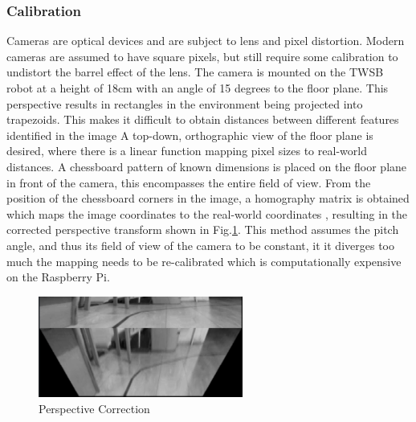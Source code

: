         \subsubsection{Calibration}
        Cameras are optical devices and are subject to lens and pixel distortion. Modern cameras are assumed to have square pixels, 
        but still require some calibration to undistort the barrel effect of the lens. 
        The camera is mounted on the TWSB robot at a height of 18cm with an angle of 15 degrees to the floor plane.
        This perspective results in rectangles in the environment being projected into trapezoids.  This makes it difficult to 
        obtain distances between different features identified in the image \cite{tuohy2010distance}
        A top-down, orthographic view of the floor plane is desired, where there is a linear function mapping pixel sizes 
        to real-world distances. A chessboard pattern of known dimensions is placed on the floor plane in front of the camera, 
        this encompasses the entire field of view. From the position of the chessboard corners in the image, 
        a homography matrix is obtained which maps the image coordinates to the real-world coordinates \cite{bradski2008learning},
        resulting in the corrected perspective transform shown in Fig.\ref{fig:perspective}. 
        This method assumes the pitch angle, and thus its field of view of the camera to be constant, it it diverges too much the 
        mapping needs to be re-calibrated which is computationally expensive on the Raspberry Pi.
        \begin{figure}[H]
            \centering
            \includegraphics[width=0.6\textwidth]{visionpipeline/perspective.png}
            \caption{Perspective Correction}
            \label{fig:perspective}
        \end{figure}

        \pagebreak{}
